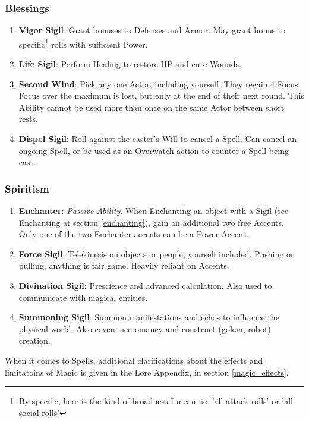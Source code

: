 \subsubsection{Blessings}
\begin{enumerate}
    \item \textbf{Vigor Sigil}: Grant bonuses to Defenses and Armor. May grant bonus to specific\footnote{By specific, here is the kind of broadness I mean: ie. 'all attack rolls' or 'all social rolls'} rolls with sufficient Power.
    \item \textbf{Life Sigil}: Perform Healing to restore HP and cure Wounds.
    \item \textbf{Second Wind}: Pick any one Actor, including yourself. They regain 4 Focus. Focus over the maximum is lost, but only at the end of their next round. This Ability cannot be used more than once on the same Actor between short rests.
    \item \textbf{Dispel Sigil}: Roll against the caster's Will to cancel a Spell. Can cancel an ongoing Spell, or be used as an Overwatch action to counter a Spell being cast.
\end{enumerate}

\subsubsection{Spiritism}
\begin{enumerate}
    \item \textbf{Enchanter}: \textit{Passive Ability}. When Enchanting an object with a Sigil (see Enchanting at section \ref{enchanting}), gain an additional two free Accents. Only one of the two Enchanter accents can be a Power Accent.
    \item \textbf{Force Sigil}: Telekinesis on objects or people, yourself included. Pushing or pulling, anything is fair game. Heavily reliant on Accents.
    \item \textbf{Divination Sigil}: Prescience and advanced calculation. Also used to communicate with magical entities.
    \item \textbf{Summoning Sigil}: Summon manifestations and echos to influence the physical world. Also covers necromancy and construct (golem, robot) creation.
\end{enumerate}

When it comes to Spells, additional clarifications about the effects and limitatoins of Magic is given in the Lore Appendix, in section \ref{magic_effects}.


